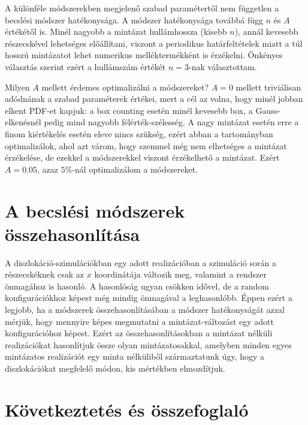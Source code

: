 \documentclass[10pt,a4paper]{scrartcl}
\begin{document}
A különféle módszerekben megjelenő szabad paramétertől nem független a becslési módszer hatékonysága. A módszer hatékonysága továbbá függ $n$ és $A$ értékétől is. Minél nagyobb a mintázat hullámhossza (kisebb $n$), annál kevesebb részecskével lehetséges előállítani, viszont a periodikus határfeltételek miatt a túl hosszú mintázatot lehet numerikus melléktermékként is érzékelni. Önkényes választás szerint ezért a hullámszám értékét $n=3$-nak választottam.

Milyen $A$ mellett érdemes optimalizálni a módszereket? $A=0$ mellett triviálisan adódnának a szabad paraméterek értékei, mert a cél az volna, hogy minél jobban elkent PDF-et kapjuk: a box counting esetén minél kevesebb box, a Gauss-elkenésnél pedig mind nagyobb félérték-szélesség. A nagy mintázat esetén erre a finom kiértékelés esetén eleve nincs szükség, ezért abban a tartományban optimalizálok, ahol azt várom, hogy szemmel még nem elhetséges a mintázat érzékelése, de ezekkel a módszerekkel viszont érzékelhető a mintázat. Ezért $A=0.05$, azaz $5\%$-nál optimalizálom a módszereket.

\section{A becslési módszerek összehasonlítása}
A diszlokáció-szimulációkban egy adott realizációban a szimuláció során a részecskéknek csak az $x$ koordinátája változik meg, valamint a rendszer önmagához is hasonló. A hasonlóság ugyan csökken idővel, de a random konfigurációkhoz képest még mindig önmagával a leghasonlóbb. Éppen ezért a legjobb, ha a módszerek összehasonlításában a módszer hatékonyságát azzal mérjük, hogy mennyire képes megmutatni a mintázat-változást egy adott konfigurációhoz képest. Ezért az összehasonlításokban a mintázat nélküli realizációkat hasonlítjuk össze olyan mintázatosakkal, amelyben minden egyes mintázatos realizációt egy minta nélküliből származtatunk úgy, hogy a diszlokációkat megfelelő módon, kis mértékben elmozdítjuk.



\section{Következtetés és összefoglaló}
\end{document}
